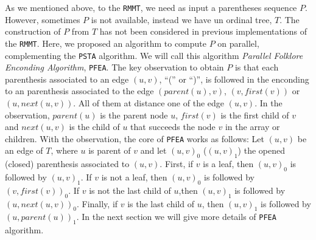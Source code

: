     As we mentioned above, to the {\tt RMMT}, we need as input a parentheses sequence $P$. However, sometimes $P$ is not available, instead we have un ordinal tree, $T$. The construction of $P$ from $T$ has not been considered in previous implementations of the {\tt RMMT}. Here, we proposed an algorithm to compute $P$ on parallel, complementing the {\tt PSTA} algorithm. We will call this algorithm \emph{Parallel Folklore Enconding Algorithm}, {\tt PFEA}. The key observation to obtain $P$ is that each parenthesis associated to an edge $(u,v)$, ``('' or ``)'', is followed in the enconding to an parenthesis associated to the edge $(parent(u), v)$, $(v, first(v))$ or $(u, next(u,v))$. All of them at distance one of the edge $(u,v)$. In the observation, $parent(u)$ is the parent node $u$, $first(v)$ is the first child of $v$ and $next(u,v)$ is the child of $u$ that succeeds the node $v$ in the array or children. With the observation, the core of {\tt PFEA} works as follows: Let $(u,v)$ be an edge of $T$, where $u$ is parent of $v$ and let $(u,v)_{0}$ ($(u,v)_{1}$) the opened (closed) parenthesis associated to $(u,v)$. First, if $v$ is a leaf, then $(u,v)_{0}$ is followed by $(u,v)_{1}$. If $v$ is not a leaf, then $(u,v)_{0}$ is followed by $(v,first(v))_{0}$. If $v$ is not the last child of $u$,then $(u,v)_{1}$ is followed by $(u,next(u,v))_{0}$. Finally, if $v$ is the last child of $u$, then $(u,v)_{1}$ is followed by $(u,parent(u))_{1}$. In the next section we will give more details of {\tt PFEA} algorithm.